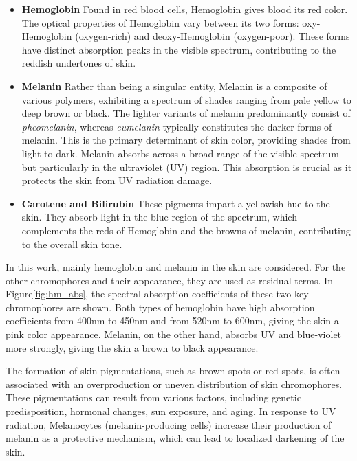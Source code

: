 \begin{spacing}{1.5}
\begin{itemize}
    \item \textbf{Hemoglobin} Found in red blood cells, Hemoglobin gives blood its red color. The optical properties of Hemoglobin vary between its two forms: oxy-Hemoglobin (oxygen-rich) and deoxy-Hemoglobin (oxygen-poor). These forms have distinct absorption peaks in the visible spectrum, contributing to the reddish undertones of skin.
    \item \textbf{Melanin} Rather than being a singular entity, Melanin is a composite of various polymers, exhibiting a spectrum of shades ranging from pale yellow to deep brown or black. The lighter variants of melanin predominantly consist of \textit{pheomelanin}, whereas \textit{eumelanin} typically constitutes the darker forms of melanin\cite{alalufEthnicVariationMelanin2002a}. This is the primary determinant of skin color\cite{doiSpectralEstimationHuman2003}, providing shades from light to dark. Melanin absorbs across a broad range of the visible spectrum but particularly in the ultraviolet (UV) region\cite{ANDERSON198113}. This absorption is crucial as it protects the skin from UV radiation damage. 
    \item \textbf{Carotene and Bilirubin} These pigments impart a yellowish hue to the skin. They absorb light in the blue region of the spectrum, which complements the reds of Hemoglobin and the browns of melanin, contributing to the overall skin tone\cite{ANDERSON198113}.
\end{itemize}


In this work, mainly hemoglobin and melanin in the skin are considered. For the other chromophores and their appearance, they are used as residual terms. In Figure\ref{fig:hm_abs}, the spectral absorption coefficients of these two key chromophores are shown. Both types of hemoglobin have high absorption coefficients from 400nm to 450nm and from 520nm to 600nm, giving the skin a pink color appearance. Melanin, on the other hand, absorbs UV and blue-violet more strongly, giving the skin a brown to black appearance.

The formation of skin pigmentations, such as brown spots or red spots, is often associated with an overproduction or uneven distribution of skin chromophores. These pigmentations can result from various factors, including genetic predisposition, hormonal changes, sun exposure, and aging. In response to UV radiation, Melanocytes (melanin-producing cells) increase their production of melanin as a protective mechanism, which can lead to localized darkening of the skin.


\end{spacing}
